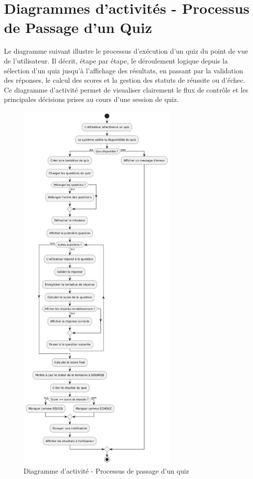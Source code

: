 \documentclass[12pt,a4paper]{report}
\begin{document}
\section{Diagrammes d'activités - Processus de Passage d'un Quiz}

Le diagramme suivant illustre le processus d'exécution d'un quiz du point de vue de l'utilisateur. Il décrit, étape par étape, le déroulement logique depuis la sélection d'un quiz jusqu'à l'affichage des résultats, en passant par la validation des réponses, le calcul des scores et la gestion des statuts de réussite ou d'échec. Ce diagramme d'activité permet de visualiser clairement le flux de contrôle et les principales décisions prises au cours d'une session de quiz.

\begin{figure}[H]
\centering
\includegraphics[width=0.7\textwidth]{latex_media/media/image20.png}
\caption{Diagramme d'activité - Processus de passage d'un quiz}
\label{fig:diagramme-activite-quiz}
\end{figure}
\end{document}
